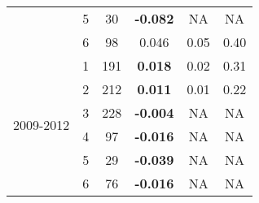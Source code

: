 \begin{table}[htbp]
\begin{tabular}{rrrrrr}
    \multicolumn{1}{c}{} & \multicolumn{1}{c}{5} & \multicolumn{1}{c}{30} & \multicolumn{1}{c}{\textbf{-0.082 }} & \multicolumn{1}{c}{NA} & \multicolumn{1}{c}{NA} \\
    \multicolumn{1}{c}{} & \multicolumn{1}{c}{6} & \multicolumn{1}{c}{98} & \multicolumn{1}{c}{0.046 } & \multicolumn{1}{c}{0.05 } & \multicolumn{1}{c}{0.40 } \\\midrule
    \multicolumn{1}{c}{\multirow{6}[2]{*}{\begin{sideways}2009-2012\end{sideways}}} & \multicolumn{1}{c}{1} & \multicolumn{1}{c}{191} & \multicolumn{1}{c}{\textbf{0.018 }} & \multicolumn{1}{c}{0.02 } & \multicolumn{1}{c}{0.31 } \\
    \multicolumn{1}{c}{} & \multicolumn{1}{c}{2} & \multicolumn{1}{c}{212} & \multicolumn{1}{c}{\textbf{0.011 }} & \multicolumn{1}{c}{0.01 } & \multicolumn{1}{c}{0.22 } \\
    \multicolumn{1}{c}{} & \multicolumn{1}{c}{3} & \multicolumn{1}{c}{228} & \multicolumn{1}{c}{\textbf{-0.004 }} & \multicolumn{1}{c}{NA} & \multicolumn{1}{c}{NA} \\
    \multicolumn{1}{c}{} & \multicolumn{1}{c}{4} & \multicolumn{1}{c}{97} & \multicolumn{1}{c}{\textbf{-0.016 }} & \multicolumn{1}{c}{NA} & \multicolumn{1}{c}{NA} \\
    \multicolumn{1}{c}{} & \multicolumn{1}{c}{5} & \multicolumn{1}{c}{29} & \multicolumn{1}{c}{\textbf{-0.039 }} & \multicolumn{1}{c}{NA} & \multicolumn{1}{c}{NA} \\
    \multicolumn{1}{c}{} & \multicolumn{1}{c}{6} & \multicolumn{1}{c}{76} & \multicolumn{1}{c}{\textbf{-0.016 }} & \multicolumn{1}{c}{NA} & \multicolumn{1}{c}{NA} \\
    \bottomrule
    \end{tabular}%
  \label{tab:NO3TVPHPA}%
\end{table}%
